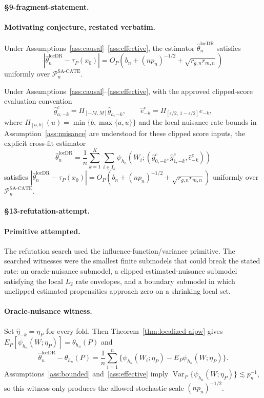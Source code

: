 \paragraph{\S9-fragment-statement.}
\paragraph{Motivating conjecture, restated verbatim.}
Under Assumptions~\ref{ass:causal}--\ref{ass:effective}, the estimator $\hat\theta_n^{\mathrm{locDR}}$ satisfies
\[
  \left|\hat\theta_n^{\mathrm{locDR}}-\tau_P(x_0)\right|
  =O_P\!\left(b_n+(n p_n)^{-1/2}+\sqrt{r_{g,n}r_{m,n}}\right)
\]
uniformly over $\mathcal{P}_n^{\mathrm{SA\text{-}CATE}}$.

\begin{theorem}\label{thm:upper}
Under Assumptions~\ref{ass:causal}--\ref{ass:effective}, with the approved clipped-score evaluation convention
\[
  \hat g^c_{a,-k}=\Pi_{[-M,M]}\hat g_{a,-k},\qquad
  \hat e^c_{-k}=\Pi_{[\epsilon/2,\,1-\epsilon/2]}\hat e_{-k},
\]
where $\Pi_{[a,b]}(u)=\min\{b,\max\{a,u\}\}$ and the local nuisance-rate bounds in Assumption~\ref{ass:nuisance} are understood for these clipped score inputs, the explicit cross-fit estimator
\[
  \hat\theta_n^{\mathrm{locDR}}
  =
  \frac{1}{n}\sum_{k=1}^K\sum_{i\in I_k}
  \psi_{h_n}\!\left(W_i;(\hat g^c_{0,-k},\hat g^c_{1,-k},\hat e^c_{-k})\right)
\]
satisfies $\left|\hat\theta_n^{\mathrm{locDR}}-\tau_P(x_0)\right|=O_P\!\left(b_n+(n p_n)^{-1/2}+\sqrt{r_{g,n}r_{m,n}}\right)$ uniformly over $\mathcal{P}_n^{\mathrm{SA\text{-}CATE}}$.
\end{theorem}

\paragraph{\S13-refutation-attempt.}
\paragraph{Primitive attempted.}
The refutation search used the influence-function/variance primitive.  The searched witnesses were the smallest finite submodels that could break the stated rate: an oracle-nuisance submodel, a clipped estimated-nuisance submodel satisfying the local $L_2$ rate envelopes, and a boundary submodel in which unclipped estimated propensities approach zero on a shrinking local set.

\paragraph{Oracle-nuisance witness.}
Set $\hat\eta_{-k}=\eta_P$ for every fold.  Then Theorem~\ref{thm:localized-aipw} gives $E_P[\psi_{h_n}(W;\eta_P)]=\theta_{h_n}(P)$ and
\[
  \hat\theta_n^{\mathrm{locDR}}-\theta_{h_n}(P)
  =
  \frac1n\sum_{i=1}^n\{\psi_{h_n}(W_i;\eta_P)-E_P\psi_{h_n}(W;\eta_P)\}.
\]
Assumptions~\ref{ass:bounded} and~\ref{ass:effective} imply
$\operatorname{Var}_P\{\psi_{h_n}(W;\eta_P)\}\lesssim p_n^{-1}$, so this witness only produces the allowed stochastic scale $(n p_n)^{-1/2}$.


